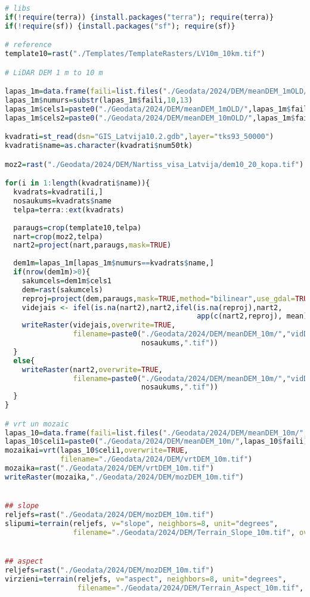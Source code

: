 \documentclass[
]{book}
\begin{document}
\begin{lstlisting}[language=R]
# libs
if(!require(terra)) {install.packages("terra"); require(terra)}
if(!require(sf)) {install.packages("sf"); require(sf)}

# reference
template10=rast("./Templates/TemplateRasters/LV10m_10km.tif")

# LiDAR DEM 1 m to 10 m 

lapas_1m=data.frame(faili=list.files("./Geodata/2024/DEM/meanDEM_1mOLD/",pattern="*.tif$"))
lapas_1m$numurs=substr(lapas_1m$faili,10,13)
lapas_1m$cels1=paste0("./Geodata/2024/DEM/meanDEM_1mOLD/",lapas_1m$faili)
lapas_1m$cels2=paste0("./Geodata/2024/DEM/meanDEM_10mOLD/",lapas_1m$faili)

kvadrati=st_read(dsn="GIS_Latvija10.2.gdb",layer="tks93_50000")
kvadrati$name=as.character(kvadrati$num50tk)

moz2=rast("./Geodata/2024/DEM/Nartiss_visa_Latvija/dem10_20_kopa.tif")

for(i in 1:length(kvadrati$name)){
  kvadrats=kvadrati[i,]
  nosaukums=kvadrats$name
  telpa=terra::ext(kvadrats)
  
  paraugs=crop(template10,telpa)
  nart=crop(moz2,telpa)
  nart2=project(nart,paraugs,mask=TRUE)
  
  dem1m=lapas_1m[lapas_1m$numurs==kvadrats$name,]
  if(nrow(dem1m)>0){
    sakumcels=dem1m$cels1
    dem=rast(sakumcels)
    reproj=project(dem,paraugs,mask=TRUE,method="bilinear",use_gdal=TRUE)
    videjais <- ifel(is.na(nart2),nart2,ifel(is.na(reproj),nart2,
                                             app(c(nart2,reproj), mean)))
    writeRaster(videjais,overwrite=TRUE,
                filename=paste0("./Geodata/2024/DEM/meanDEM_10m/","vidDEM_",
                                nosaukums,".tif"))
  }
  else{
    writeRaster(nart2,overwrite=TRUE,
                filename=paste0("./Geodata/2024/DEM/meanDEM_10m/","vidDEM_",
                                nosaukums,".tif"))
  }
}

# vrt un mozaic
lapas_10=data.frame(faili=list.files("./Geodata/2024/DEM/meanDEM_10m/",pattern="*.tif$"))
lapas_10$celi1=paste0("./Geodata/2024/DEM/meanDEM_10m/",lapas_10$faili)
mozaikai=vrt(lapas_10$celi1,overwrite=TRUE,
             filename="./Geodata/2024/DEM/vrtDEM_10m.tif")
mozaika=rast("./Geodata/2024/DEM/vrtDEM_10m.tif")
writeRaster(mozaika,"./Geodata/2024/DEM/mozDEM_10m.tif")


## slope
reljefs=rast("./Geodata/2024/DEM/mozDEM_10m.tif")
slipumi=terrain(reljefs, v="slope", neighbors=8, unit="degrees", 
                filename="./Geodata/2024/DEM/Terrain_Slope_10m.tif", overwrite=TRUE)  


## aspect 
reljefs=rast("./Geodata/2024/DEM/mozDEM_10m.tif")
virzieni=terrain(reljefs, v="aspect", neighbors=8, unit="degrees", 
                 filename="./Geodata/2024/DEM/Terrain_Aspect_10m.tif", overwrite=TRUE)
\end{lstlisting}
\end{document}
